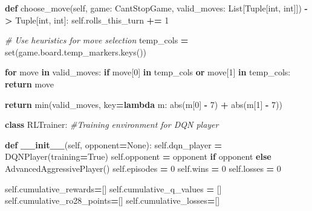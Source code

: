 \documentclass[12pt]{article}
\newenvironment{Shaded}{\begin{snugshade}}{\end{snugshade}}
\newcommand{\BuiltInTok}[1]{#1}
\newcommand{\CommentTok}[1]{\textcolor[rgb]{0.56,0.35,0.01}{\textit{#1}}}
\newcommand{\ControlFlowTok}[1]{\textcolor[rgb]{0.13,0.29,0.53}{\textbf{#1}}}
\newcommand{\DecValTok}[1]{\textcolor[rgb]{0.00,0.00,0.81}{#1}}
\newcommand{\FunctionTok}[1]{\textcolor[rgb]{0.13,0.29,0.53}{\textbf{#1}}}
\newcommand{\KeywordTok}[1]{\textcolor[rgb]{0.13,0.29,0.53}{\textbf{#1}}}
\newcommand{\NormalTok}[1]{#1}
\newcommand{\OperatorTok}[1]{\textcolor[rgb]{0.81,0.36,0.00}{\textbf{#1}}}
\newcommand{\VariableTok}[1]{\textcolor[rgb]{0.00,0.00,0.00}{#1}}
\begin{document}
\begin{thesis}
\begin{Shaded}
\begin{Highlighting}[]
    \KeywordTok{def}\NormalTok{ choose\_move(}\VariableTok{self}\NormalTok{, game: CantStopGame, valid\_moves: }
\NormalTok{                                List[Tuple[}\BuiltInTok{int}\NormalTok{, }\BuiltInTok{int}\NormalTok{]]) }\OperatorTok{{-}\textgreater{}}\NormalTok{ Tuple[}\BuiltInTok{int}\NormalTok{, }\BuiltInTok{int}\NormalTok{]:}
        \VariableTok{self}\NormalTok{.rolls\_this\_turn }\OperatorTok{+=} \DecValTok{1}
        
        \CommentTok{\# Use heuristics for move selection}
\NormalTok{        temp\_cols }\OperatorTok{=} \BuiltInTok{set}\NormalTok{(game.board.temp\_markers.keys())}
        
        \ControlFlowTok{for}\NormalTok{ move }\KeywordTok{in}\NormalTok{ valid\_moves:}
            \ControlFlowTok{if}\NormalTok{ move[}\DecValTok{0}\NormalTok{] }\KeywordTok{in}\NormalTok{ temp\_cols }\KeywordTok{or}\NormalTok{ move[}\DecValTok{1}\NormalTok{] }\KeywordTok{in}\NormalTok{ temp\_cols:}
                \ControlFlowTok{return}\NormalTok{ move}
        
        \ControlFlowTok{return} \BuiltInTok{min}\NormalTok{(valid\_moves, key}\OperatorTok{=}\KeywordTok{lambda}\NormalTok{ m: }\BuiltInTok{abs}\NormalTok{(m[}\DecValTok{0}\NormalTok{] }\OperatorTok{{-}} \DecValTok{7}\NormalTok{) }\OperatorTok{+} \BuiltInTok{abs}\NormalTok{(m[}\DecValTok{1}\NormalTok{] }\OperatorTok{{-}} \DecValTok{7}\NormalTok{))}


\KeywordTok{class}\NormalTok{ RLTrainer:}
    \CommentTok{\#Training environment for DQN player}
    
    \KeywordTok{def} \FunctionTok{\_\_init\_\_}\NormalTok{(}\VariableTok{self}\NormalTok{, opponent}\OperatorTok{=}\VariableTok{None}\NormalTok{):}
        \VariableTok{self}\NormalTok{.dqn\_player }\OperatorTok{=}\NormalTok{ DQNPlayer(training}\OperatorTok{=}\VariableTok{True}\NormalTok{)}
        \VariableTok{self}\NormalTok{.opponent }\OperatorTok{=}\NormalTok{ opponent }\ControlFlowTok{if}\NormalTok{ opponent }\ControlFlowTok{else}\NormalTok{ AdvancedAggressivePlayer()}
        \VariableTok{self}\NormalTok{.episodes }\OperatorTok{=} \DecValTok{0}
        \VariableTok{self}\NormalTok{.wins }\OperatorTok{=} \DecValTok{0}
        \VariableTok{self}\NormalTok{.losses }\OperatorTok{=} \DecValTok{0}
    
        \VariableTok{self}\NormalTok{.cumulative\_rewards}\OperatorTok{=}\NormalTok{[]}
        \VariableTok{self}\NormalTok{.cumulative\_q\_values }\OperatorTok{=}\NormalTok{ []}
        \VariableTok{self}\NormalTok{.cumulative\_ro28\_points}\OperatorTok{=}\NormalTok{[]}
        \VariableTok{self}\NormalTok{.cumulative\_losses}\OperatorTok{=}\NormalTok{[]}


\end{Highlighting}
\end{Shaded}
\end{thesis}
\end{document}
